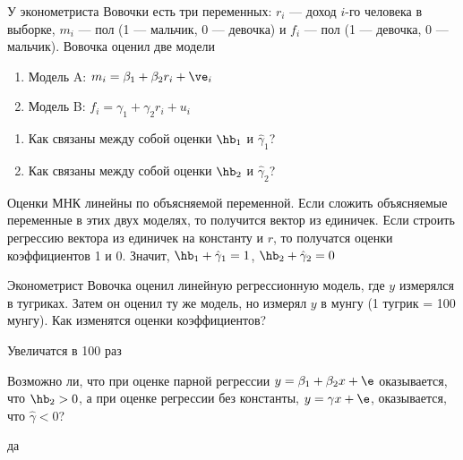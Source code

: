 \documentclass[pdftex,11pt,openany]{book}\usepackage[]{graphicx}\usepackage[]{color}
\begin{document}
\begin{solution}
\end{solution}
 


\begin{problem}
 У эконометриста Вовочки есть три переменных: $r_i$ --- доход $i$-го человека в выборке, $m_i$ --- пол (1 --- мальчик, 0 --- девочка) и $f_i$ --- пол (1 --- девочка, 0 --- мальчик). Вовочка оценил две модели
\begin{enumerate}
\item[] Модель A: $m_i=\beta_1+\beta_2 r_i+\ve_i$
\item[] Модель B: $f_i=\gamma_1+\gamma_2 r_i+u_i$
\end{enumerate}
\begin{enumerate}
\item Как связаны между собой оценки $\hb_1$ и $\hat{\gamma}_1$?
\item Как связаны между собой оценки $\hb_2$ и $\hat{\gamma}_2$? 
\end{enumerate}
\end{problem}

\begin{solution}
 Оценки МНК линейны по объясняемой переменной. Если сложить объясняемые переменные в этих двух моделях, то получится вектор из единичек. Если строить регрессию вектора из единичек на константу и $r$, то получатся оценки коэффициентов 1 и 0. Значит, $\hb_1+\hat{\gamma}_1=1$, $\hb_2+\hat{\gamma}_2=0$ 
\end{solution}



\begin{problem}
 Эконометрист Вовочка оценил линейную регрессионную модель, где $y$ измерялся в тугриках. Затем он оценил ту же модель, но измерял $y$ в мунгу (1 тугрик = 100 мунгу). Как изменятся оценки коэффициентов?
\end{problem}

\begin{solution}
 Увеличатся в 100 раз
\end{solution}


\begin{problem}
 Возможно ли, что при оценке парной регрессии $y=\beta_1+\beta_2 x+\e$ оказывается, что $\hb_2>0$, а при оценке регрессии без константы, $y=\gamma x+\e$, оказывается, что $\hat{\gamma}<0$?
\end{problem}

\begin{solution}
 да
\end{solution}
\end{document}
